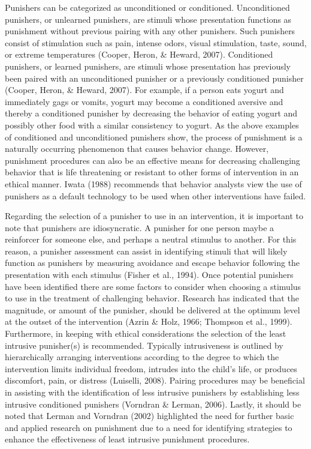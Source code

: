 Punishers can be categorized as unconditioned or conditioned. Unconditioned punishers, or unlearned punishers, are stimuli whose presentation functions as punishment without previous pairing with any other punishers. Such punishers consist of stimulation such as pain, intense odors, visual stimulation, taste, sound, or extreme temperatures (Cooper, Heron, \& Heward, 2007).  Conditioned punishers, or learned punishers, are stimuli whose presentation has previously been paired with an unconditioned punisher or a previously conditioned punisher (Cooper, Heron, \& Heward, 2007).   For example, if a person eats yogurt and immediately gags or vomits, yogurt may become a conditioned aversive and thereby a conditioned punisher by decreasing the behavior of eating yogurt and possibly other food with a similar consistency to yogurt.  As the above examples of conditioned and unconditioned punishers show, the process of punishment is a naturally occurring phenomenon that causes behavior change.  However, punishment procedures can also be an effective means for decreasing challenging behavior that is life threatening or resistant to other forms of intervention in an ethical manner.  Iwata (1988) recommends that behavior analysts view the use of punishers as a default technology to be used when other interventions have failed.  

Regarding the selection of a punisher to use in an intervention, it is important to note that punishers are idiosyncratic. A punisher for one person maybe a reinforcer for someone else, and perhaps a neutral stimulus to another. For this reason, a punisher assessment can assist in identifying stimuli that will likely function as punishers by measuring avoidance and escape behavior following the presentation with each stimulus (Fisher et al., 1994). Once potential punishers have been identified there are some factors to consider when choosing a stimulus to use in the treatment of challenging behavior. Research has indicated that the magnitude, or amount of the punisher, should be delivered at the optimum level at the outset of the intervention (Azrin \& Holz, 1966; Thompson et al., 1999).  Furthermore, in keeping with ethical considerations the selection of the least intrusive punisher(s) is recommended.  Typically intrusiveness is outlined by hierarchically arranging interventions according to the degree to which the intervention limits individual freedom, intrudes into the child's life, or produces discomfort, pain, or distress (Luiselli, 2008). Pairing procedures may be beneficial in assisting with the identification of less intrusive punishers by establishing less intrusive conditioned punishers (Vorndran \& Lerman, 2006).  Lastly, it should be noted that Lerman and Vorndran (2002) highlighted the need for further basic and applied research on punishment due to a need for identifying strategies to enhance the effectiveness of least intrusive punishment procedures. 
%
